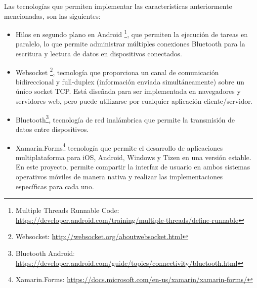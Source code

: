 Las tecnologías que permiten implementar las características anteriormente mencionadas, son las siguientes:
\begin{itemize}

\item Hilos en segundo plano en Android \footnote{Multiple Threads Runnable Code: \url{https://developer.android.com/training/multiple-threads/define-runnable}}, que permiten la ejecución de tareas en paralelo, lo que permite  administrar múltiples conexiones Bluetooth para la escritura y lectura de datos en dispositivos conectados.

\item Websocket \footnote{Websocket: \url{http://websocket.org/aboutwebsocket.html}}, tecnología que proporciona un canal de comunicación bidireccional y full-duplex (información enviada simultáneamente) sobre un único socket TCP. Está diseñada para ser implementada en navegadores y servidores web, pero puede utilizarse por cualquier aplicación cliente/servidor.

\item Bluetooth\footnote{Bluetooth Android: \url{https://developer.android.com/guide/topics/connectivity/bluetooth.html}}, tecnología de red inalámbrica que permite la transmisión de datos entre dispositivos.

\item Xamarin.Forms\footnote{Xamarin.Forms: \url{https://docs.microsoft.com/en-us/xamarin/xamarin-forms/}} tecnología que permite el desarrollo de aplicaciones multiplataforma para iOS, Android, Windows y Tizen en una versión estable. En este proyecto, permite compartir la interfaz de usuario en ambos sistemas operativos móviles de manera nativa y realizar las implementaciones específicas para cada uno.

\end{itemize}



